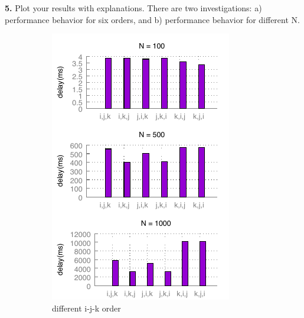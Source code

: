\documentclass{article}
\begin{document}
\noindent\textbf{5.} Plot your results with explanations. There are two investigations: a) performance behavior for six orders, and b) performance behavior for different N.\\
    \begin{figure}[h!]
        \centering
        \begin{subfigure}[b]{0.3\linewidth}
          \includegraphics[width=\linewidth]{matrix_ijk.pdf}
          \caption{different i-j-k order}
          \label{fig:ijk}
        \end{subfigure}
        \begin{subfigure}[b]{0.3\linewidth}

\end{subfigure}
\end{figure}
\end{document}

